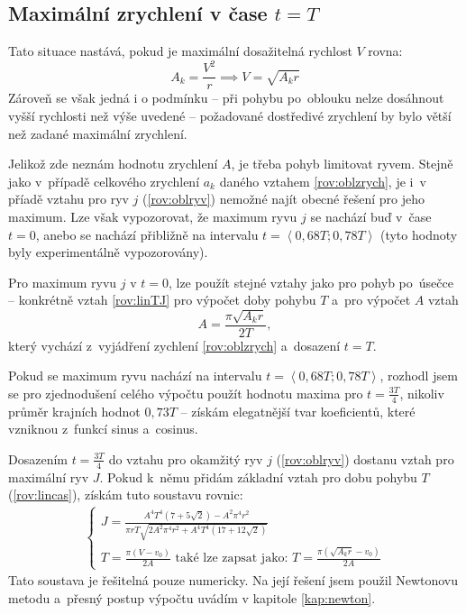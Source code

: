 		\subsection{Maximální zrychlení v čase $t=T$}\label{kap:maxT}
		Tato situace nastává, pokud je maximální dosažitelná rychlost $V$ rovna:
		\begin{equation}\label{rov:oblpodm}
			A_k = \frac{V^2}{r} \implies
			V=\sqrt{A_k r}
		\end{equation}
		Zároveň se však jedná i o podmínku -- při pohybu po~oblouku nelze dosáhnout vyšší rychlosti než výše uvedené -- požadované dostředivé zrychlení by bylo větší než zadané maximální zrychlení.
		
		Jelikož zde neznám hodnotu zrychlení $A$, je třeba pohyb limitovat ryvem. Stejně jako v~případě celkového zrychlení $a_k$ daného vztahem \ref{rov:oblzrych}, je i~v příadě vztahu pro ryv $j$ (\ref{rov:oblryv}) nemožné najít obecné řešení pro jeho maximum. Lze však vypozorovat, že maximum ryvu $j$ se nachází buď v~čase $t=0$, anebo se nachází přibližně na intervalu $t=\left\langle 0,68T; 0,78T\right\rangle$ (tyto hodnoty byly experimentálně vypozorovány).
		
		Pro maximum ryvu $j$ v $t=0$, lze použít stejné vztahy jako pro pohyb po~úsečce -- konkrétně vztah \ref{rov:linTJ} pro výpočet doby pohybu $T$ a~pro výpočet $A$ vztah
		\begin{equation}\label{rov:oblA}
			A = \frac{\pi\sqrt{A_k r}}{2T},
		\end{equation}
		který vychází z~vyjádření zychlení \ref{rov:oblzrych} a~dosazení $t=T$.
		
		Pokud se maximum ryvu nachází na intervalu $t=\left\langle 0,68T; 0,78T\right\rangle$, rozhodl jsem se pro zjednodušení celého výpočtu použít hodnotu maxima pro $t=\frac{3T}{4}$, nikoliv průměr krajních hodnot $0,73T$ -- získám elegatnější tvar koeficientů, které vzniknou z~funkcí sinus a~cosinus.
		
		Dosazením $t=\frac{3T}{4}$ do vztahu pro okamžitý ryv $j$ (\ref{rov:oblryv}) dostanu vztah pro maximální ryv $J$. Pokud k~němu přidám základní vztah pro dobu pohybu $T$ (\ref{rov:lincas}), získám tuto soustavu rovnic:
		\begin{eqnarray}
			\label{rov:oblJT}
			\begin{cases}
			J=\frac{A^4T^4\left(7+5\sqrt{2}\right)-A^2\pi^4r^2}{\pi rT\sqrt{2A^2\pi^4r^2+A^4T^4\left(17+12\sqrt{2}\right)}} \\
			T=\frac{\pi(V-v_0)}{2A}\text{ také lze zapsat jako: }T=\frac{\pi(\sqrt{A_k r}-v_0)}{2A}
			\end{cases}
		\end{eqnarray}
		Tato soustava je řešitelná pouze numericky. Na její řešení jsem použil Newtonovu metodu a~přesný postup výpočtu uvádím v kapitole \ref{kap:newton}.
		
